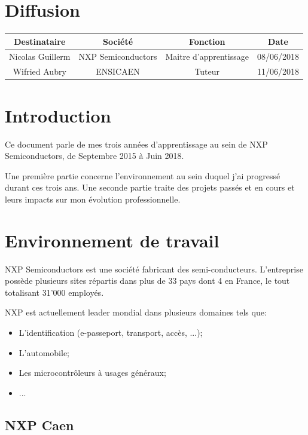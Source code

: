 \documentclass[french,12pt,a4paper,titlepage,openright,openbib]{report}
\begin{document}
{\let \clearpage \relax \chapter*{Diffusion}}
\begin{table}[ht]
	\label{tab:diffusion}
	\centering
	\begin{tabular}{|c|c|c|c|}
		\hline
		{\bf Destinataire} & {\bf Société}      & {\bf Fonction}   		 & {\bf Date}\\
		\hline
		Nicolas Guillerm   & NXP Semiconductors & Maitre d'apprentissage & 08/06/2018 \\
		\hline
		Wifried Aubry      & ENSICAEN 			& Tuteur				 & 11/06/2018 \\
		\hline
	\end{tabular}
\end{table}

\chapter{Introduction}
Ce document parle de mes trois années d'apprentissage au sein de NXP Semiconductors, de Septembre 2015 à Juin 2018.

Une première partie concerne l'environnement au sein duquel j'ai progressé durant ces trois ans.
Une seconde partie traite des projets passés et en cours et leurs impacts sur mon évolution professionnelle.

\chapter{Environnement de travail}
NXP Semiconductors est une société fabricant des semi-conducteurs.
L'entreprise possède plusieurs sites répartis dans plus de 33 pays dont 4 en France, le tout totalisant 31'000 employés.

NXP est actuellement leader mondial dans plusieurs domaines \cite{website:nxpsite} tels que:

\begin{itemize}
\item L'identification (e-passeport, transport, accès, ...);
\item L'automobile;
\item Les microcontrôleurs à usages généraux;
\item ...
\end{itemize}

\section{NXP Caen}
\end{document}
